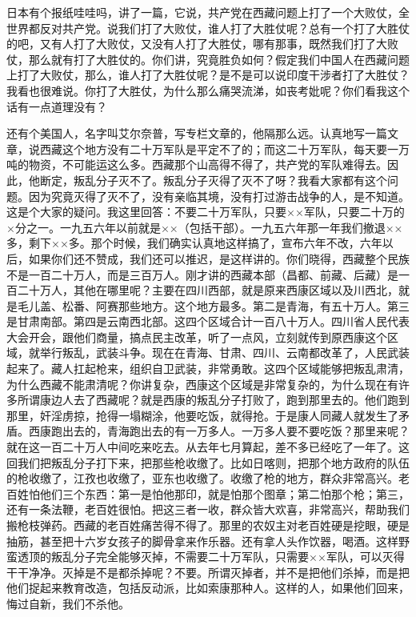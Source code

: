 日本有个报纸哇哇吗，讲了一篇，它说，共产党在西藏问题上打了一个大败仗，全世界都反对共产党。说我们打了大败仗，谁人打了大胜仗呢？总有一个打了大胜仗的吧，又有人打了大败仗，又没有人打了大胜仗，哪有那事，既然我们打了大败仗，那么就有打了大胜仗的。你们讲，究竟胜负如何？假定我们中国人在西藏问题上打了大败仗，那么，谁人打了大胜仗呢？是不是可以说印度干涉者打了大胜仗？我看也很难说。你打了大胜仗，为什么那么痛哭流涕，如丧考妣呢？你们看我这个话有一点道理没有？

还有个美国人，名字叫艾尔奈普，写专栏文章的，他隔那么远。认真地写一篇文章，说西藏这个地方没有二十万军队是平定不了的；而这二十万军队，每天要一万吨的物资，不可能运这么多。西藏那个山高得不得了，共产党的军队难得去。因此，他断定，叛乱分子灭不了。叛乱分子灭得了灭不了呀？我看大家都有这个问题。因为究竟灭得了灭不了，没有亲临其境，没有打过游击战争的人，是不知道。这是个大家的疑问。我这里回答：不要二十万军队，只要××军队，只要二十万的×分之一。一九五六年以前就是××（包括干部）。一九五六年那一年我们撤退××多，剩下××多。那个时候，我们确实认真地这样搞了，宣布六年不改，六年以后，如果你们还不赞成，我们还可以推迟，是这样讲的。你们晓得，西藏整个民族不是一百二十万人，而是三百万人。刚才讲的西藏本部（昌都、前藏、后藏）是一百二十万人，其他在哪里呢？主要在四川西部，就是原来西康区域以及川西北，就是毛儿盖、松番、阿赛那些地方。这个地方最多。第二是青海，有五十万人。第三是甘肃南部。第四是云南西北部。这四个区域合计一百八十万人。四川省人民代表大会开会，跟他们商量，搞点民主改革，听了一点风，立刻就传到原西康这个区域，就举行叛乱，武装斗争。现在在青海、甘肃、四川、云南都改革了，人民武装起来了。藏人扛起枪来，组织自卫武装，非常勇敢。这四个区域能够把叛乱肃清，为什么西藏不能肃清呢？你讲复杂，西康这个区域是非常复杂的，为什么现在有许多所谓康边人去了西藏呢？就是西康的叛乱分子打败了，跑到那里去的。他们跑到那里，奸淫虏掠，抢得一塌糊涂，他要吃饭，就得抢。于是康人同藏人就发生了矛盾。西康跑出去的，青海跑出去的有一万多人。一万多人要不要吃饭？那里来呢？就在这一百二十万人中间吃来吃去。从去年七月算起，差不多已经吃了一年了。这回我们把叛乱分子打下来，把那些枪收缴了。比如日喀则，把那个地方政府的队伍的枪收缴了，江孜也收缴了，亚东也收缴了。收缴了枪的地方，群众非常高兴。老百姓怕他们三个东西：第一是怕他那印，就是怕那个图章；第二怕那个枪；第三，还有一条法鞭，老百姓很怕。把这三者一收，群众皆大欢喜，非常高兴，帮助我们搬枪枝弹药。西藏的老百姓痛苦得不得了。那里的农奴主对老百姓硬是挖眼，硬是抽筋，甚至把十六岁女孩子的脚骨拿来作乐器。还有拿人头作饮器，喝酒。这样野蛮透顶的叛乱分子完全能够灭掉，不需要二十万军队，只需要××军队，可以灭得干干净净。灭掉是不是都杀掉呢？不要。所谓灭掉者，并不是把他们杀掉，而是把他们捉起来教育改造，包括反动派，比如索康那种人。这样的人，如果他们回来，悔过自新，我们不杀他。

